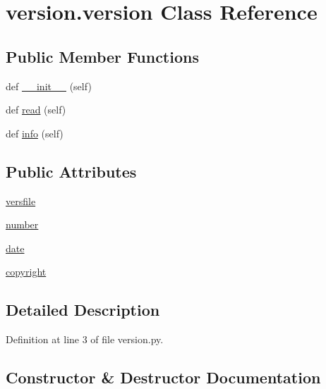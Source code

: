 \hypertarget{classversion_1_1version}{}\section{version.\+version Class Reference}
\label{classversion_1_1version}
\subsection*{Public Member Functions}
\begin{DoxyCompactItemize}
\item 
def \hyperlink{classversion_1_1version_a2a76e6aff129fda5b01dff50807ea388}{\+\_\+\+\_\+init\+\_\+\+\_\+} (self)
\item 
def \hyperlink{classversion_1_1version_a59c02faaf269452d4574d8a7978871cc}{read} (self)
\item 
def \hyperlink{classversion_1_1version_a286cc1eb62e2aebe8c572f449b0041bf}{info} (self)
\end{DoxyCompactItemize}
\subsection*{Public Attributes}
\begin{DoxyCompactItemize}
\item 
\hyperlink{classversion_1_1version_a1b3a3618376b629cb88066864c489a3c}{versfile}
\item 
\hyperlink{classversion_1_1version_af4cef468b0397eb1728ceaf65a31ce14}{number}
\item 
\hyperlink{classversion_1_1version_a13223788120e350890af3fb0dcd1b260}{date}
\item 
\hyperlink{classversion_1_1version_a917f6a98ea7478ddbb874d3aff79a1c9}{copyright}
\end{DoxyCompactItemize}


\subsection{Detailed Description}


Definition at line 3 of file version.\+py.



\subsection{Constructor \& Destructor Documentation}
\mbox{\label{classversion_1_1version_a2a76e6aff129fda5b01dff50807ea388}} 
